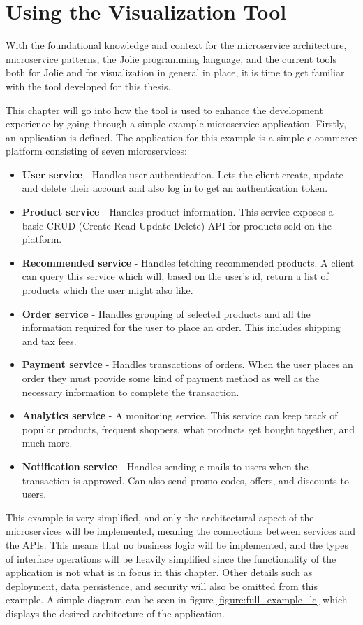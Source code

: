 \chapter{Using the Visualization Tool}
With the foundational knowledge and context for the microservice architecture, microservice patterns, the Jolie programming language, and the current tools both for Jolie and for visualization in general in place, it is time to get familiar with the tool developed for this thesis.

This chapter will go into how the tool is used to enhance the development experience by going through a simple example microservice application.
Firstly, an application is defined. The application for this example is a simple e-commerce platform consisting of seven microservices:

\begin{itemize}
    \item \textbf{User service} - Handles user authentication. Lets the client create, update and delete their account and also log in to get an authentication token.
    \item \textbf{Product service} - Handles product information. This service exposes a basic CRUD (Create Read Update Delete) API for products sold on the platform.
    \item \textbf{Recommended service} - Handles fetching recommended products. A client can query this service which will, based on the user's id, return a list of products which the user might also like.
    \item \textbf{Order service} - Handles grouping of selected products and all the information required for the user to place an order. This includes shipping and tax fees.
    \item \textbf{Payment service} - Handles transactions of orders. When the user places an order they must provide some kind of payment method as well as the necessary information to complete the transaction.
    \item \textbf{Analytics service} - A monitoring service. This service can keep track of popular products, frequent shoppers, what products get bought together, and much more.
    \item \textbf{Notification service} - Handles sending e-mails to users when the transaction is approved. Can also send promo codes, offers, and discounts to users.
\end{itemize}
This example is very simplified, and only the architectural aspect of the microservices will be implemented, meaning the connections between services and the APIs. This means that no business logic will be implemented, and
the types of interface operations will be heavily simplified since the functionality of the application is not what is in focus in this chapter.
Other details such as deployment, data persistence, and security will also be omitted from this example. A simple diagram can be seen in figure \ref*{figure:full_example_lc} which displays the desired architecture of the application.

